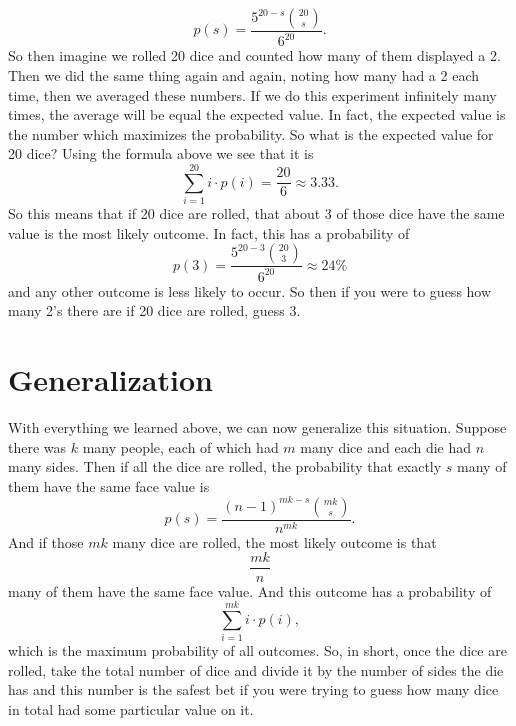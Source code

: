 \documentclass[leqno]{article}
\theoremstyle{definition}
\theoremstyle{remark}
\theoremstyle{definition}
\begin{document}
    \begin{equation*}
        p(s)=\frac{5^{20-s}\binom{20}{s}}{6^{20}}.
    \end{equation*}
So then imagine we rolled 20 dice and counted how many of them displayed a 2. Then we did the same thing again and again, noting how many had a 2 each time, then we averaged these numbers. If we do this experiment infinitely many times, the average will be equal the expected value. In fact, the expected value is the number which maximizes the probability. So what is the expected value for 20 dice? Using the formula above we see that it is
    \begin{equation*}
        \sum_{i=1}^{20}i\cdot p(i)=\frac{20}{6}\approx 3.33.
    \end{equation*}
So this means that if 20 dice are rolled, that about 3 of those dice have the same value is the most likely outcome. In fact, this has a probability of 
    \begin{equation*}
        p(3)=\frac{5^{20-3}\binom{20}{3}}{6^{20}}\approx 24\%
    \end{equation*}
and any other outcome is less likely to occur. So then if you were to guess how many 2's there are if 20 dice are rolled, guess 3.
\newpage
\section{Generalization} 
With everything we learned above, we can now generalize this situation. Suppose there was $k$ many people, each of which had $m$ many dice and each die had $n$ many sides. Then if all the dice are rolled, the probability that exactly $s$ many of them have the same face value is
    \begin{equation*}
        p(s)=\frac{(n-1)^{mk-s}\binom{mk}{s}}{n^{mk}}.
    \end{equation*}
And if those $mk$ many dice are rolled, the most likely outcome is that 
    \begin{equation*}
        \frac{mk}{n}
    \end{equation*} 
many of them have the same face value. And this outcome has a probability of 
    \begin{equation*}
        \sum_{i=1}^{mk}i\cdot p(i),
    \end{equation*}
which is the maximum probability of all outcomes. So, in short, once the dice are rolled, take the total number of dice and divide it by the number of sides the die has and this number is the safest bet if you were trying to guess how many dice in total had some particular value on it.
\end{document}
